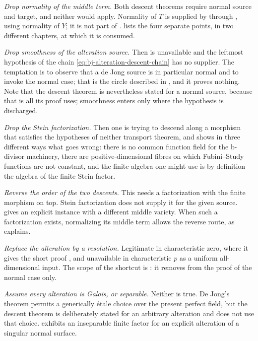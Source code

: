 \emph{Drop normality of the middle term.}  Both descent theorems require
normal source and target, and neither would apply.  Normality of $T$ is
supplied by
\cite[\href{https://stacks.math.columbia.edu/tag/035L}{Tag 035L}]
{stacks-project} through , using normality of
$Y$; it is not part of
\cite[\href{https://stacks.math.columbia.edu/tag/03H0}{Tag 03H0}]
{stacks-project}.   lists the four separate
points, in two different chapters, at which it is consumed.

\emph{Drop smoothness of the alteration source.}  Then
 is unavailable and the leftmost hypothesis of
the chain \eqref{eq:bj-alteration-descent-chain} has no supplier.  The
temptation is to observe that a de Jong source is in particular normal and to
invoke the normal case; that is the circle described in
, and it proves nothing.  Note that the
descent theorem  is nevertheless stated for
a normal source, because that is all its proof uses; smoothness enters only
where the hypothesis is discharged.

\emph{Drop the Stein factorization.}  Then one is trying to descend along a
morphism that satisfies the hypotheses of neither transport theorem, and
 shows in three different ways what goes wrong:
there is no common function field for the b-divisor machinery, there are
positive-dimensional fibres on which Fubini--Study functions are not
constant, and the finite algebra one might use is by definition the algebra
of the finite Stein factor.

\emph{Reverse the order of the two descents.}  This needs a
factorization with the finite morphism on top.
Stein factorization does not supply it for the given source.
 gives an explicit instance
with a different middle variety.  When such a factorization exists,
normalizing its middle term allows the reverse route, as
 explains.

\emph{Replace the alteration by a resolution.}  Legitimate in
characteristic zero, where it gives the short proof
, and unavailable in characteristic $p$
as a uniform all-dimensional input.  The scope of the shortcut is
: it removes
 from the proof of the normal case only.

\emph{Assume every alteration is Galois, or separable.}  Neither is true.
De Jong's theorem permits a generically étale choice over the present
perfect field, but the descent theorem is deliberately stated for an
arbitrary alteration and does not use that choice.
 exhibits an inseparable finite factor for an
explicit alteration of a singular normal surface.

